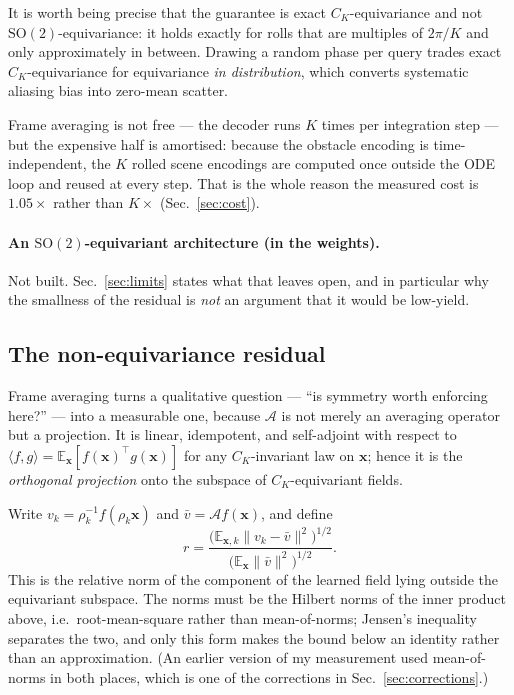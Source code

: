 \documentclass[11pt,a4paper]{article}
\begin{document}
It is worth being precise that the guarantee is exact $C_K$-equivariance and not
$\mathrm{SO}(2)$-equivariance: it holds exactly for rolls that are multiples of
$2\pi/K$ and only approximately in between. Drawing a random phase per query
trades exact $C_K$-equivariance for equivariance \emph{in distribution}, which
converts systematic aliasing bias into zero-mean scatter.

Frame averaging is not free --- the decoder runs $K$ times per integration step
--- but the expensive half is amortised: because the obstacle encoding is
time-independent, the $K$ rolled scene encodings are computed once outside the
ODE loop and reused at every step. That is the whole reason the measured cost is
$1.05\times$ rather than $K\times$ (Sec.~\ref{sec:cost}).

\paragraph{An $\mathrm{SO}(2)$-equivariant architecture (in the weights).} Not
built. Sec.~\ref{sec:limits} states what that leaves open, and in particular why
the smallness of the residual is \emph{not} an argument that it would be
low-yield.

\subsection{The non-equivariance residual}
\label{sec:residual}

Frame averaging turns a qualitative question --- ``is symmetry worth enforcing
here?'' --- into a measurable one, because $\mathcal{A}$ is not merely an
averaging operator but a projection. It is linear, idempotent, and self-adjoint
with respect to $\langle f, g \rangle = \mathbb{E}_\mathbf{x}[f(\mathbf{x})^\top
g(\mathbf{x})]$ for any $C_K$-invariant law on $\mathbf{x}$; hence it is the
\emph{orthogonal projection} onto the subspace of $C_K$-equivariant fields.

Write $v_k = \rho_k^{-1} f(\rho_k \mathbf{x})$ and $\bar v = \mathcal{A}f(\mathbf{x})$,
and define
\begin{equation}
  r = \frac{\bigl(\mathbb{E}_{\mathbf{x},k}\|v_k - \bar v\|^2\bigr)^{1/2}}
           {\bigl(\mathbb{E}_{\mathbf{x}}\|\bar v\|^2\bigr)^{1/2}} .
  \label{eq:resid}
\end{equation}
This is the relative norm of the component of the learned field lying outside the
equivariant subspace. The norms must be the Hilbert norms of the inner product
above, i.e.\ root-mean-square rather than mean-of-norms; Jensen's inequality
separates the two, and only this form makes the bound below an identity rather
than an approximation. (An earlier version of my measurement used mean-of-norms
in both places, which is one of the corrections in Sec.~\ref{sec:corrections}.)
\end{document}
